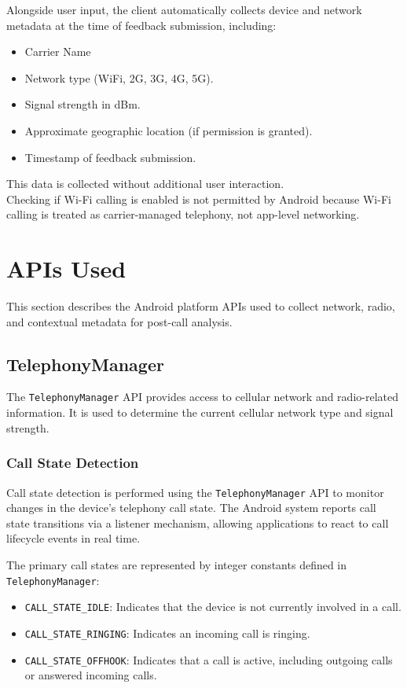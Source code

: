 \documentclass{article}
\begin{document}
Alongside user input, the client automatically collects device and network metadata at the time of feedback submission, including:
\begin{itemize}
    \item Carrier Name
    \item Network type (WiFi, 2G, 3G, 4G, 5G).
    \item Signal strength in dBm.
    \item Approximate geographic location (if permission is granted).
    \item Timestamp of feedback submission.
\end{itemize}

This data is collected without additional user interaction.\\
Checking if Wi-Fi calling is enabled is not permitted by Android because Wi-Fi calling is treated as carrier-managed telephony, not app-level networking.


\section{APIs Used}

This section describes the Android platform APIs used to collect network, radio, and contextual metadata for post-call analysis.

\subsection{TelephonyManager}

The \texttt{TelephonyManager} API provides access to cellular network and radio-related information. It is used to determine the current cellular network type and signal strength.

\subsubsection{Call State Detection}

Call state detection is performed using the \texttt{TelephonyManager} API to monitor changes in the device's telephony call state. The Android system reports call state transitions via a listener mechanism, allowing applications to react to call lifecycle events in real time.

The primary call states are represented by integer constants defined in \texttt{TelephonyManager}:
\begin{itemize}
    \item \texttt{CALL\_STATE\_IDLE}: Indicates that the device is not currently involved in a call.
    \item \texttt{CALL\_STATE\_RINGING}: Indicates an incoming call is ringing.
    \item \texttt{CALL\_STATE\_OFFHOOK}: Indicates that a call is active, including outgoing calls or answered incoming calls.
\end{itemize}
\end{document}
